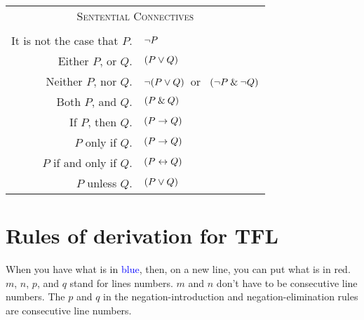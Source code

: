 \begin{center}
\label{app.symbolization}
\begin{tabular*}{\textwidth}{rl}
\multicolumn{2}{c}{\textsc{Sentential Connectives}}\\ \\
It is not the case that $P$. & ${\neg} P$\\
Either $P$, or $Q$. & $(P \vee Q)$\\
Neither $P$, nor $Q$. & ${\neg}(P \vee Q)$\ or \ $({\neg} P \mathbin{\&} {\neg} Q)$\\
Both $P$, and $Q$. & $(P \mathbin{\&} Q)$\\
If $P$, then $Q$. & $(P \rightarrow Q)$\\
$P$ only if $Q$. & $(P \rightarrow Q)$\\
$P$ if and only if $Q$. & $(P \leftrightarrow Q)$\\
$P$ unless $Q$. & $(P \vee Q)$\\
\end{tabular*}
\end{center}




\newpage


\section{Rules of derivation for TFL}\label{ProofRules}

When you have what is in \textcolor{blue}{blue}, then, on a new line, you can put what is in \textcolor{red2}{red}. $m$, $n$, $p$, and $q$ stand for lines numbers. $m$ and $n$ don't have to be consecutive line numbers. The $p$ and $q$ in the negation-introduction and negation-elimination rules are consecutive line numbers.

